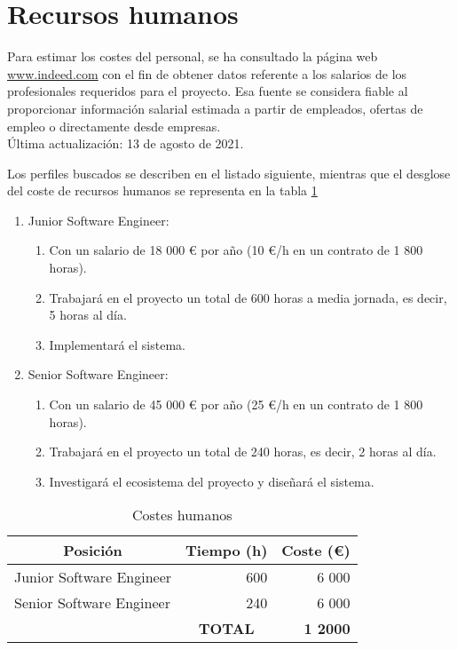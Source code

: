 \section{Recursos humanos}

Para estimar los costes del personal, se ha consultado la página web \url{www.indeed.com} con el fin de obtener datos referente a los salarios de los profesionales requeridos para el proyecto. Esa fuente se considera fiable al proporcionar información salarial estimada a partir de empleados, ofertas de empleo o directamente desde empresas. \\
Última actualización: 13 de agosto de 2021.

Los perfiles buscados se describen en el listado siguiente, mientras que el desglose del coste de recursos humanos se representa en la tabla \ref{tab:presupuesto-humanos}
\begin{enumerate}
	\item Junior Software Engineer:
	\begin{enumerate}
		\item Con un salario de 18 000 € por año (10 €/h en un contrato de 1 800 horas).
		\item Trabajará en el proyecto un total de 600 horas a media jornada, es decir, 5 horas al día.
		\item Implementará el sistema.
	\end{enumerate}

	\item Senior Software Engineer:
	\begin{enumerate}
		\item Con un salario de 45 000 € por año (25 €/h en un contrato de 1 800 horas).
		\item Trabajará en el proyecto un total de 240 horas, es decir, 2 horas al día.
		\item Investigará el ecosistema del proyecto y diseñará el sistema.
	\end{enumerate}
\end{enumerate}


\begin{table}[H]
\centering

\begin{tabular}{lcr}
\hline
\multicolumn{1}{c}{\textbf{Posición}} & \textbf{Tiempo (h)}     & \multicolumn{1}{c}{\textbf{Coste (€)}} \\ \hline
Junior Software Engineer              & \multicolumn{1}{r}{600} & 6 000                                   \\
Senior Software Engineer              & \multicolumn{1}{r}{240} & 6 000                                   \\ \hline
                                      & \textbf{TOTAL}          & \textbf{1 2000}
\end{tabular}%
\caption{Costes humanos}
\label{tab:presupuesto-humanos}
\end{table}


